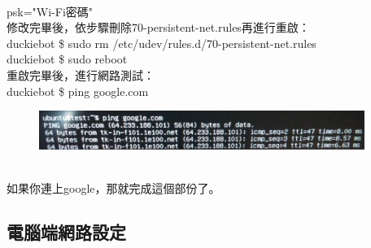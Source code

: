 \documentclass{article}
\begin{document}
\\psk="Wi-Fi密碼"
\\修改完畢後，依步驟刪除70-persistent-net.rules再進行重啟：
\\duckiebot \$ sudo rm /etc/udev/rules.d/70-persistent-net.rules
\\duckiebot \$ sudo reboot
\\重啟完畢後，進行網路測試：
\\duckiebot \$ ping google.com
\begin{figure}[htp]
    \begin{center}
        \includegraphics[width=300pt]{pic/圖片12.jpg}
    \end{center}
\end{figure}
\\如果你連上google，那就完成這個部份了。

\subsection{電腦端網路設定}
\end{document}
